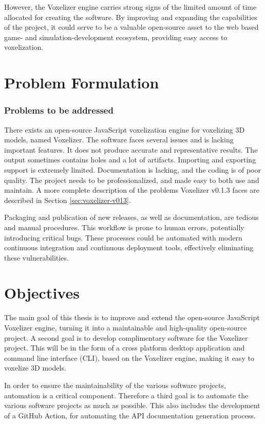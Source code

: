 However, the Voxelizer engine carries strong signs of the limited amount of time allocated for creating the software. By improving and expanding the capabilities of the project, it could serve to be a valuable open-source asset to the web based game- and simulation-development ecosystem, providing easy access to voxelization.

\section{Problem Formulation}

\subsubsection{Problems to be addressed}
There exists an open-source JavaScript voxelization engine for voxelizing 3D models, named Voxelizer. The software faces several issues and is lacking important features. It does not produce accurate and representative results. The output sometimes contains holes and a lot of artifacts. Importing and exporting support is extremely limited. Documentation is lacking, and the coding is of poor quality. The project needs to be professionalized, and made easy to both use and maintain. A more complete description of the problems Voxelizer v0.1.3 faces are described in Section \ref{sec:voxelizer-v013}.

Packaging and publication of new releases, as well as documentation, are tedious and manual procedures. This workflow is prone to human errors, potentially introducing critical bugs. These processes could be automated with modern continuous integration and continuous deployment tools, effectively eliminating these vulnerabilities.

\section{Objectives}
The main goal of this thesis is to improve and extend the open-source JavaScript Voxelizer engine, turning it into a maintainable and high-quality open-source project. A second goal is to develop complimentary software for the Voxelizer project. This will be in the form of a cross platform desktop application and command line interface (CLI), based on the Voxelizer engine, making it easy to voxelize 3D models.

In order to ensure the maintainability of the various software projects, automation is a critical component. Therefore a third goal is to automate the various software projects as much as possible. This also includes the development of a GitHub Action, for automating the API documentation generation process.

